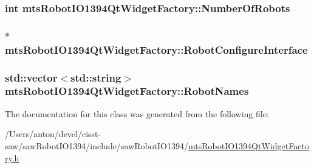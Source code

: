 \subsubsection[{Number\+Of\+Robots}]{\setlength{\rightskip}{0pt plus 5cm}int mts\+Robot\+I\+O1394\+Qt\+Widget\+Factory\+::\+Number\+Of\+Robots\hspace{0.3cm}{\ttfamily [protected]}}\label{classmts_robot_i_o1394_qt_widget_factory_a12d58bb02a5e646dc4d901430db1753c}
\hypertarget{classmts_robot_i_o1394_qt_widget_factory_a5456e298db56b3eb79c89bbbedd21846}{}
\subsubsection[{Robot\+Configure\+Interface}]{$\ast$ mts\+Robot\+I\+O1394\+Qt\+Widget\+Factory\+::\+Robot\+Configure\+Interface\hspace{0.3cm}{\ttfamily [protected]}}\label{classmts_robot_i_o1394_qt_widget_factory_a5456e298db56b3eb79c89bbbedd21846}
\hypertarget{classmts_robot_i_o1394_qt_widget_factory_ad869dbe413a4475f430975043773b5e9}{}
\subsubsection[{Robot\+Names}]{\setlength{\rightskip}{0pt plus 5cm}std\+::vector$<$std\+::string$>$ mts\+Robot\+I\+O1394\+Qt\+Widget\+Factory\+::\+Robot\+Names\hspace{0.3cm}{\ttfamily [protected]}}\label{classmts_robot_i_o1394_qt_widget_factory_ad869dbe413a4475f430975043773b5e9}


The documentation for this class was generated from the following file\+:\begin{DoxyCompactItemize}
\item 
/\+Users/anton/devel/cisst-\/saw/saw\+Robot\+I\+O1394/include/saw\+Robot\+I\+O1394/\hyperlink{mts_robot_i_o1394_qt_widget_factory_8h}{mts\+Robot\+I\+O1394\+Qt\+Widget\+Factory.\+h}\end{DoxyCompactItemize}
